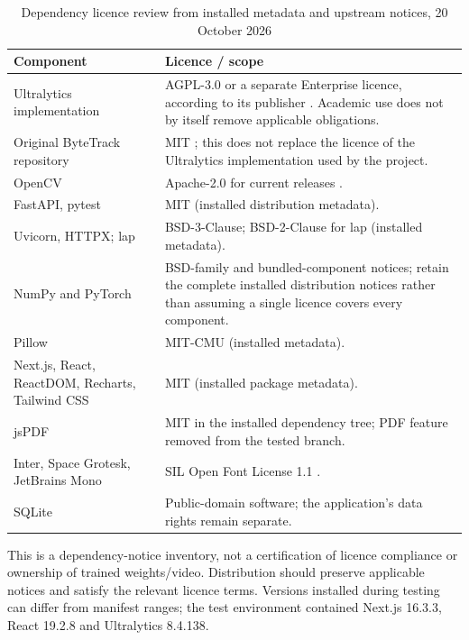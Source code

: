 \begin{longtable}{P{0.32\textwidth}P{0.55\textwidth}}
\caption{Dependency licence review from installed metadata and upstream notices, 20 October 2026}\\
\toprule
Component & Licence / scope\\
\midrule
\endhead
Ultralytics implementation & AGPL-3.0 or a separate Enterprise licence, according to its publisher \cite{ultralyticsLicense}. Academic use does not by itself remove applicable obligations.\\
Original ByteTrack repository & MIT \cite{bytetrackLicense}; this does not replace the licence of the Ultralytics implementation used by the project.\\
OpenCV & Apache-2.0 for current releases \cite{opencvLicense}.\\
FastAPI, pytest & MIT (installed distribution metadata).\\
Uvicorn, HTTPX; lap & BSD-3-Clause; BSD-2-Clause for lap (installed metadata).\\
NumPy and PyTorch & BSD-family and bundled-component notices; retain the complete installed distribution notices rather than assuming a single licence covers every component.\\
Pillow & MIT-CMU (installed metadata).\\
Next.js, React, ReactDOM, Recharts, Tailwind CSS & MIT (installed package metadata).\\
jsPDF & MIT in the installed dependency tree; PDF feature removed from the tested branch.\\
Inter, Space Grotesk, JetBrains Mono & SIL Open Font License 1.1 \cite{interLicense,spaceGroteskLicense,jetbrainsMonoLicense}.\\
SQLite & Public-domain software; the application's data rights remain separate.\\
\bottomrule
\end{longtable}
This is a dependency-notice inventory, not a certification of licence compliance or ownership of trained weights/video. Distribution should preserve applicable notices and satisfy the relevant licence terms. Versions installed during testing can differ from manifest ranges; the test environment contained Next.js 16.3.3, React 19.2.8 and Ultralytics 8.4.138.

